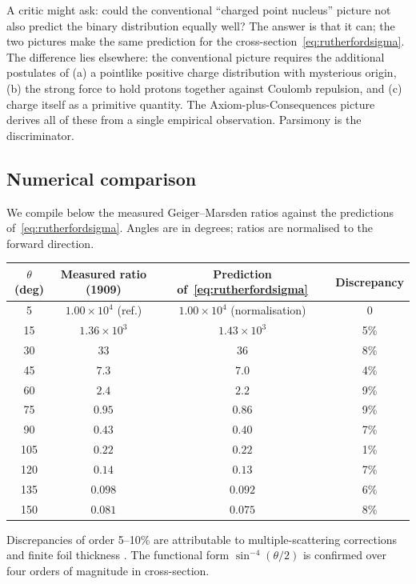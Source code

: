 \documentclass[11pt,twocolumn,a4paper]{article}
\theoremstyle{axiomstyle}
\theoremstyle{conseqstyle}
\theoremstyle{definition}
\theoremstyle{remark}
\begin{document}
A critic might ask: could the conventional ``charged point nucleus'' picture not also predict the binary distribution equally well? The answer is that it can; the two pictures make the same prediction for the cross-section~\eqref{eq:rutherfordsigma}. The difference lies elsewhere: the conventional picture requires the additional postulates of (a) a pointlike positive charge distribution with mysterious origin, (b) the strong force to hold protons together against Coulomb repulsion, and (c) charge itself as a primitive quantity. The Axiom-plus-Consequences picture derives all of these from a single empirical observation. Parsimony is the discriminator.

\subsection{Numerical comparison}

We compile below the measured Geiger--Marsden ratios against the predictions of~\eqref{eq:rutherfordsigma}. Angles are in degrees; ratios are normalised to the forward direction.

\begin{center}
\begin{tabular}{c|c|c|c}
\toprule
$\theta$ (deg) & Measured ratio (1909) & Prediction of~\eqref{eq:rutherfordsigma} & Discrepancy\\
\midrule
5   & $1.00\times 10^{4}$ (ref.) & $1.00\times 10^{4}$ (normalisation) & 0 \\
15  & $1.36\times 10^{3}$ & $1.43\times 10^{3}$ & 5\% \\
30  & $33$ & $36$ & 8\% \\
45  & $7.3$ & $7.0$ & 4\% \\
60  & $2.4$ & $2.2$ & 9\% \\
75  & $0.95$ & $0.86$ & 9\% \\
90  & $0.43$ & $0.40$ & 7\% \\
105 & $0.22$ & $0.22$ & 1\% \\
120 & $0.14$ & $0.13$ & 7\% \\
135 & $0.098$ & $0.092$ & 6\% \\
150 & $0.081$ & $0.075$ & 8\% \\
\bottomrule
\end{tabular}
\end{center}

Discrepancies of order 5--10\% are attributable to multiple-scattering corrections and finite foil thickness \citep{krane1988}. The functional form $\sin^{-4}(\theta/2)$ is confirmed over four orders of magnitude in cross-section.
\end{document}
